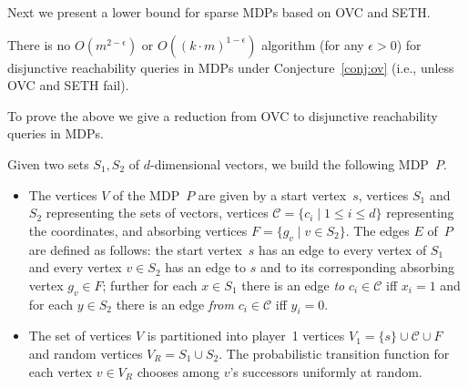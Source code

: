 \documentclass[11pt,letterpaper]{article}
\newcommand{\lu}{\textup{(}}
\newcommand{\ru}{\textup{)}\xspace}
\newcommand{\upbr}[1]{\lu #1\ru}
\newcommand{\mdp}{P\xspace}
\newif\iffullversion
\newcommand{\infull}[1]{\iffullversion #1\fi}
\begin{document}
Next we present a lower bound for sparse MDPs based on OVC and SETH.

\begin{theorem}\label{thm:reach_OVChard}
  There is no $O(m^{2-\epsilon})$ or $O((k\cdot m)^{1-\epsilon})$ algorithm
  \upbr{for any $\epsilon > 0$} for 
  disjunctive reachability queries in MDPs under Conjecture~\ref{conj:ov} \upbr{i.e., unless OVC and SETH fail}.
  \infull{In particular, there is no such algorithm deciding whether the winning set is non-empty
  or deciding whether a specific vertex is in the winning set.}
\end{theorem}

To prove the above we give a reduction from OVC to disjunctive reachability queries
in MDPs.

\begin{reduction}\label{red:OVtoMDPReach}
 Given two sets $S_1, S_2$ of $d$-dimensional vectors, we build the following MDP~$\mdp$.  
 \begin{itemize}
  \item The vertices $V$ of the MDP~$\mdp$
  are given by a start vertex~$s$, vertices $S_1$ and $S_2$ representing the 
  sets of vectors, vertices $\mathcal{C}=\{c_i \mid 1 \leq i \leq d\}$ representing the 
  coordinates, and absorbing vertices $F=\{g_v \mid v \in S_2\}$.
  The edges $E$ of~$\mdp$ are defined as follows: the start vertex~$s$
  has an edge to every vertex of $S_1$ and every vertex $v \in S_2$ has an edge to $s$
  and to its corresponding absorbing vertex $g_v \in F$; further for each $x \in S_1$
  there is an edge \emph{to} $c_i \in \mathcal{C}$ iff $x_i=1$ and for each $y \in S_2$
  there is an edge \emph{from} $c_i \in \mathcal{C}$ iff $y_i=0$.
	  
  \item The set of vertices $V$ is partitioned into player~1 vertices $V_1=\{s\} \cup \mathcal{C} \cup F$
	and random vertices $V_R= S_1 \cup S_2$.
	The probabilistic transition function for each vertex $v \in V_R$ chooses among $v$'s successors
	uniformly at random.
 \end{itemize}
\end{reduction}
\end{document}
